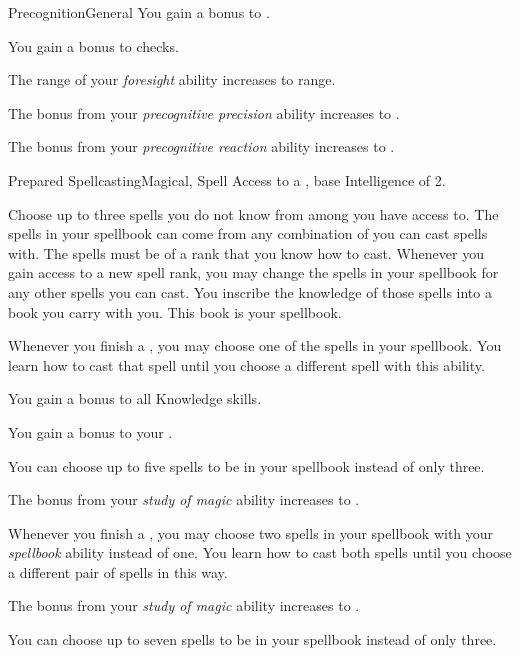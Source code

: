 \begin{feat}{Precognition}{General}
         You gain a  bonus to .

         You gain a  bonus to  checks.

         The range of your \textit{foresight} ability increases to \rnglong range.

         The bonus from your \textit{precognitive precision} ability increases to .

         The bonus from your \textit{precognitive reaction} ability increases to .
    \end{feat}

    \begin{feat}{Prepared Spellcasting}{Magical, Spell}
        \featpre Access to a , base Intelligence of 2.

         Choose up to three spells you do not know from among  you have access to.
        The spells in your spellbook can come from any combination of  you can cast spells with.
        The spells must be of a rank that you know how to cast.
        Whenever you gain access to a new spell rank, you may change the spells in your spellbook for any other spells you can cast.
        You inscribe the knowledge of those spells into a book you carry with you.
        This book is your spellbook.
        
        Whenever you finish a , you may choose one of the spells in your spellbook.
        You learn how to cast that spell until you choose a different spell with this ability.

         You gain a  bonus to all Knowledge skills.

         You gain a  bonus to your  .

         You can choose up to five spells to be in your spellbook instead of only three.

         The bonus from your \textit{study of magic} ability increases to .

         Whenever you finish a , you may choose two spells in your spellbook with your \textit{spellbook} ability instead of one.
        You learn how to cast both spells until you choose a different pair of spells in this way.

         The bonus from your \textit{study of magic} ability increases to .

         You can choose up to seven spells to be in your spellbook instead of only three.
    \end{feat}

